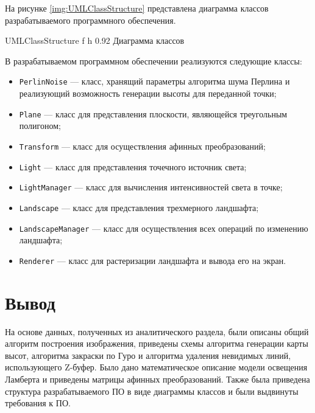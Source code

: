 На рисунке \ref{img:UMLClassStructure} представлена диаграмма классов разрабатываемого программного обеспечения.

{UMLClassStructure} %
{f} %
{h} %
{0.92\textwidth} %
{Диаграмма классов} %

\clearpage

В разрабатываемом программном обеспечении реализуются следующие классы: 

\begin{itemize}[label*=---]
	\item \texttt{PerlinNoise} --- класс, хранящий параметры алгоритма шума Перлина и реализующий возможность генерации высоты для переданной точки;
	\item \texttt{Plane} --- класс для представления плоскости, являющейся треугольным полигоном;
	\item \texttt{Transform} --- класс для осуществления афинных преобразований;
	\item \texttt{Light} --- класс  для представления точечного источник света;
	\item \texttt{LightManager} --- класс для вычисления интенсивностей света в точке;
	\item \texttt{Landscape} --- класс для представления трехмерного ландшафта;
	\item \texttt{LandscapeManager} --- класс для осуществления всех операций по изменению ландшафта;
	\item \texttt{Renderer} --- класс для растеризации ландшафта и вывода его на экран.
\end{itemize}

\section*{Вывод}

На основе данных, полученных из аналитического раздела, были описаны общий алгоритм построения изображения, приведены схемы алгоритма генерации карты высот, алгоритма закраски по Гуро и алгоритма удаления невидимых линий, использующего Z-буфер. 
Было дано математическое описание модели освещения Ламберта и приведены матрицы афинных преобразований. 
Также была приведена структура разрабатываемого ПО в виде диаграммы классов и были выдвинуты требования к ПО.
